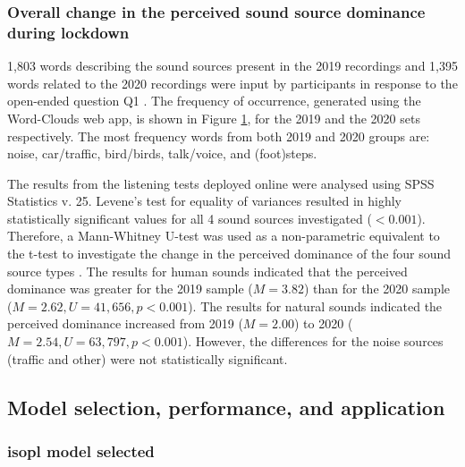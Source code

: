    \subsubsection{Overall change in the perceived sound source dominance during lockdown}

   1,803 words describing the sound sources present in the 2019 recordings and 1,395 words related to the 2020 recordings were input by participants in response to the open-ended question Q1 . The frequency of occurrence, generated using the Word-Clouds web app, is shown in Figure \ref{fig:wordclouds}, for the 2019 and the 2020 sets respectively. The most frequency words from both 2019 and 2020 groups are: noise, car/traffic, bird/birds, talk/voice, and (foot)steps.

   \begin{figure}
     \label{fig:wordclouds}
   \end{figure}

   The results from the listening tests deployed online were analysed using SPSS Statistics v. 25. Levene's test for equality of variances resulted in highly statistically significant values for all 4 sound sources investigated ($<0.001$). Therefore, a Mann-Whitney U-test was used as a non-parametric equivalent to the t-test to investigate the change in the perceived dominance of the four sound source types \citep{McKnight2010Mann}. The results for human sounds indicated that the perceived dominance was greater for the 2019 sample ($M=3.82$) than for the 2020 sample ($M=2.62, U=41,656, p<0.001$). The results for natural sounds indicated the perceived dominance increased from 2019 ($M=2.00$) to 2020 ($M=2.54, U=63,797, p<0.001$). However, the differences for the noise sources (traffic and other) were not statistically significant.

   \begin{figure}
     \label{tab:source-dominance-stats}
   \end{figure}

 \subsection{Model selection, performance, and application}

   \subsubsection{\gls{isopl} model selected}


